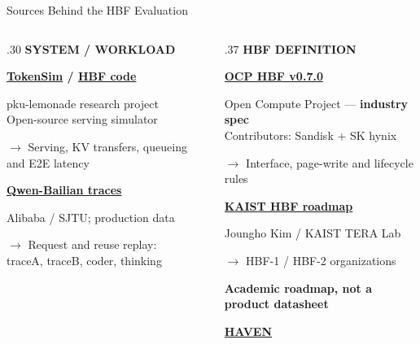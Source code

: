 \documentclass[aspectratio=169,10pt]{beamer}
\newcommand{\smalllabel}[1]{{\scriptsize\bfseries\color{Accent}\MakeUppercase{#1}}}
\begin{document}
\begin{frame}[t]{Sources Behind the HBF Evaluation}
\vspace{0cm}
\begin{columns}[T,onlytextwidth]
\begin{column}{.30\textwidth}
\smalllabel{System / workload}\par\vspace{.06cm}
\textbf{\href{https://github.com/pku-lemonade/TokenSim}{TokenSim} / \href{https://github.com/pku-lemonade/TokenSim/tree/hbf}{HBF code}}\par
\footnotesize pku-lemonade research project\\
Open-source serving simulator\par
$\rightarrow$ Serving, KV transfers, queueing and E2E latency\par\vspace{.27cm}
\normalsize\textbf{\href{https://www.usenix.org/conference/atc25/presentation/wang-jiahao}{Qwen-Bailian traces}}\par
\footnotesize Alibaba / SJTU; production data\par
$\rightarrow$ Request and reuse replay:\\
traceA, traceB, coder, thinking
\end{column}
\begin{column}{.37\textwidth}
\smalllabel{HBF definition}\par\vspace{.06cm}
\textbf{\href{https://www.opencompute.org/contributions/?project=Storage}{OCP HBF v0.7.0}}\par
\footnotesize Open Compute Project --- \textbf{industry spec}\\
Contributors: Sandisk + SK hynix\par
$\rightarrow$ Interface, page-write and lifecycle rules\par\vspace{.06cm}
\normalsize\textbf{\href{https://tera.kaist.ac.kr/}{KAIST HBF roadmap}}\par
\footnotesize Joungho Kim / KAIST TERA Lab\par
$\rightarrow$ HBF-1 / HBF-2 organizations\par
\textbf{Academic roadmap, not a product datasheet}\par\vspace{.06cm}
\normalsize\textbf{\href{https://arxiv.org/abs/2603.01175}{HAVEN}}\par

\end{column}
\end{columns}
\end{frame}
\end{document}
